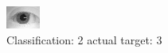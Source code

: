 \begin{figure}[h!]
\begin{center}
\includegraphics[width=0.60\columnwidth]{figures/ID1049_class_2_target_3.png}
\end{center}
\caption{ Classification: 2 actual target: 3}
\label{fig:ID1049_class_2_target_3}
\end{figure}
